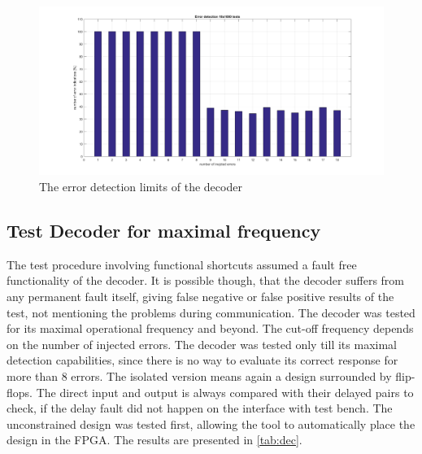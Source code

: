 \begin{figure}[h]
\centering
\includegraphics[width=\textwidth]{figures/1000_tests_error_detection.png}
\caption{The error detection limits of the decoder}
\label{fig:dec_1}
\end{figure}

\subsection{Test Decoder for maximal frequency}

The test procedure involving functional shortcuts assumed a fault free functionality of the decoder. It is possible though, that the decoder suffers from any permanent fault itself, giving false negative or false positive results of the test, not mentioning the problems during communication. The decoder was tested for its maximal operational frequency and beyond. The cut-off frequency depends on the number of injected errors. The decoder was tested only till its maximal detection capabilities, since there is no way to evaluate its correct response for more than 8 errors. The isolated version means again a design surrounded by flip-flops. The direct input and output is always compared with their delayed pairs to check, if the delay fault did not happen on the interface with test bench. The unconstrained design was tested first, allowing the tool to automatically place the design in the FPGA. The results are presented in \autoref{tab:dec}.

